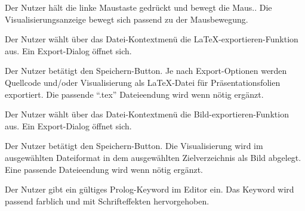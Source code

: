 \documentclass[parskip=full,11pt,twoside]{scrartcl}
\begin{document}
{Der Nutzer hält die linke Maustaste gedrückt und bewegt die Maus..}
{Die Visualisierungsanzeige bewegt sich passend zu der Mausbewegung.}




{Der Nutzer wählt über das Datei-Kontextmenü die LaTeX-exportieren-Funktion aus.}
{Ein Export-Dialog öffnet sich.}

{Der Nutzer betätigt den Speichern-Button.}
{Je nach Export-Optionen werden Quellcode und/oder Visualisierung als LaTeX-Datei für Präsentationsfolien exportiert. Die passende \enquote{.tex} Dateieendung wird wenn nötig ergänzt.}


{Der Nutzer wählt über das Datei-Kontextmenü die Bild-exportieren-Funktion aus.}
{Ein Export-Dialog öffnet sich.}

{Der Nutzer betätigt den Speichern-Button.}
{Die Visualisierung wird im ausgewählten Dateiformat in dem ausgewählten Zielverzeichnis als Bild abgelegt. Eine passende Dateieendung wird wenn nötig ergänzt.}



{Der Nutzer gibt ein gültiges Prolog-Keyword im Editor ein.}
{Das Keyword wird passend farblich und mit Schrifteffekten hervorgehoben.}

\end{document}
